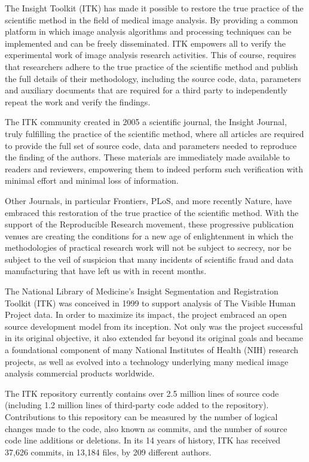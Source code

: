 \documentclass{frontiersENG} %
\begin{document}
The Insight Toolkit (ITK) has made it possible to restore the true practice of
the scientific method in the field of medical image analysis. By providing a
common platform in which image analysis algorithms and processing techniques
can be implemented and can be freely disseminated. ITK empowers all to verify
the experimental work of image analysis research activities. This of course,
requires that researchers adhere to the true practice of the scientific method
and publish the full details of their methodology, including the source code,
data, parameters and auxiliary documents that are required for a third party to
independently repeat the work and verify the findings.

The ITK community created in 2005 a scientific journal, the Insight Journal,
truly fulfilling the practice of the scientific method, where all articles are
required to provide the full set of source code, data and parameters needed to
reproduce the finding of the authors. These materials are immediately made
available to readers and reviewers, empowering them to indeed perform such
verification with minimal effort and minimal loss of information.

Other Journals, in particular Frontiers, PLoS, and more recently Nature, have
embraced this restoration of the true practice of the scientific method.  With
the support of the Reproducible Research movement, these progressive
publication venues are creating the conditions for a new age of enlightenment
in which the methodologies of practical research work will not be subject to
secrecy, nor be subject to the veil of suspicion that many incidents of
scientific fraud and data manufacturing that have left us with in recent
months.


The National Library of Medicine’s Insight Segmentation and Registration
Toolkit (ITK) was conceived in 1999 to support analysis of The Visible Human
Project data. In order to maximize its impact, the project embraced an open
source development model from its inception. Not only was the project
successful in its original objective, it also extended far beyond its original
goals and became a foundational component of many National Institutes of Health
(NIH) research projects, as well as evolved into a technology underlying many
medical image analysis commercial products worldwide.

%
%
The ITK repository currently contains over 2.5 million lines of source code
(including 1.2 million lines of third-party code added to the repository).
Contributions to this repository can be measured by the number of logical
changes made to the code, also known as commits, and the number of source code
line additions or deletions. In its 14 years of history, ITK has received
37,626 commits, in 13,184 files, by 209 different authors.
\end{document}

